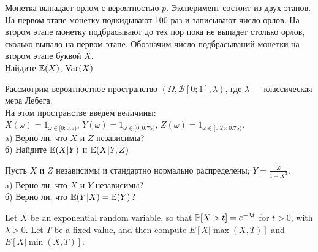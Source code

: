 \begin{problem}
Монетка выпадает орлом с вероятностью $p$. Эксперимент состоит из двух этапов. На первом этапе монетку подкидывают 100 раз и записывают число орлов. На втором этапе монетку подбрасывают до тех пор пока не выпадет столько орлов, сколько выпало на первом этапе. Обозначим число подбрасываний монетки на втором этапе буквой $X$. \\
Найдите $\E(X)$, $\Var(X)$ 
\end{problem} 
\begin{solution} 

\end{solution}

\begin{problem}
Рассмотрим вероятностное пространство
$(\Omega,\mathcal{B}[0;1],\lambda)$, где $\lambda$ --- классическая
мера Лебега.\\
На этом пространстве введем величины: \\
$X(\omega)=1_{\omega\in[0;0.5)}$,
$Y(\omega)=1_{\omega\in[0;0.75)}$,
$Z(\omega)=1_{\omega\in[0.25;0.75)}$. \\
a) Верно ли, что $X$ и $Z$ независимы? \\
б) Найдите $\E(X|Y)$ и $\E(X|Y,Z)$ 
\end{problem} 
\begin{solution} 

\end{solution}

\begin{problem}
Пусть $X$ и $Z$ независимы и стандартно нормально распределены;
$Y=\frac{Z}{1+X^{2}}$. \\
a) Верно ли, что $X$ и $Y$ независимы? \\
б) Верно ли, что $\E(Y|X)=\E(Y)$? 
\end{problem} 
\begin{solution} 

\end{solution}

\begin{problem}
 Let $X$ be an exponential random variable, so that $\P[X > t] = e^{-\lambda t}$ 
	for $t > 0$, with $\lambda > 0$. 	Let $T$ be a fixed value, and then compute 
	$E[ X | \max(X,T) ]$ and $E[X | \min(X,T)]$.  
\end{problem} 
\begin{solution} 

\end{solution}


